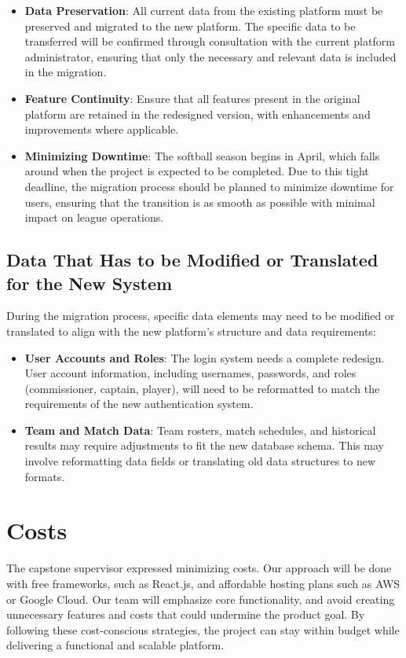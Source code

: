 \documentclass[12pt]{article}
\begin{document}
\begin{itemize}
    \item \textbf{Data Preservation}: All current data from the existing platform must be preserved and migrated to the new platform. The specific data to be transferred will be confirmed through consultation with the current platform administrator, ensuring that only the necessary and relevant data is included in the migration.
    \item \textbf{Feature Continuity}: Ensure that all features present in the original platform are retained in the redesigned version, with enhancements and improvements where applicable.
    \item \textbf{Minimizing Downtime}: The softball season begins in April, which falls around when the project is expected to be completed. Due to this tight deadline, the migration process should be planned to minimize downtime for users, ensuring that the transition is as smooth as possible with minimal impact on league operations.
\end{itemize}

\subsection{Data That Has to be Modified or Translated for the New System}
During the migration process, specific data elements may need to be modified or translated to align with the new platform's structure and data requirements:

\begin{itemize}
    \item \textbf{User Accounts and Roles}: The login system needs a complete redesign. User account information, including usernames, passwords, and roles (commissioner, captain, player), will need to be reformatted to match the requirements of the new authentication system.
    \item \textbf{Team and Match Data}: Team rosters, match schedules, and historical results may require adjustments to fit the new database schema. This may involve reformatting data fields or translating old data structures to new formats.
\end{itemize}

\section{Costs}
The capstone supervisor expressed minimizing costs. Our approach will be done with free frameworks, such as React.js, and affordable hosting plans such as AWS or Google Cloud. Our team will emphasize core functionality, and avoid creating unnecessary features and costs that could undermine the product goal. By following these cost-conscious strategies, the project can stay within budget while delivering a functional and scalable platform.
\end{document}

